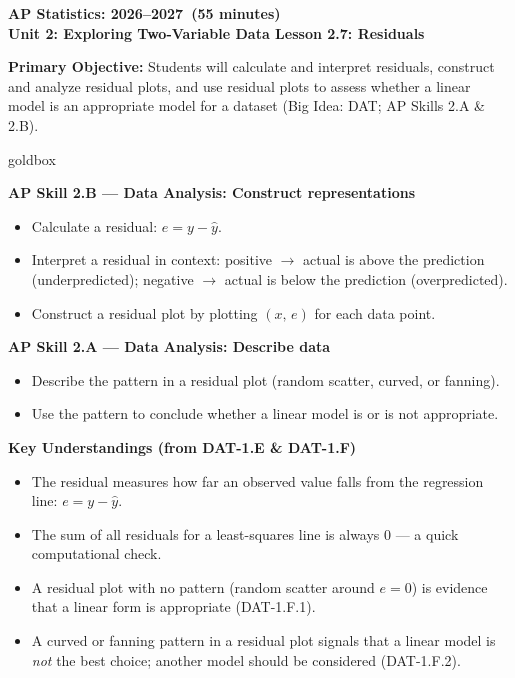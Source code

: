 \documentclass[10pt]{article}
\newcommand{\CourseName}{AP Statistics}
\newcommand{\SchoolYear}{2026--2027}
\newcommand{\MeetingLength}{55 minutes}
\newcommand{\UnitNumberName}{Unit 2: Exploring Two-Variable Data \quad}
\newcommand{\LessonNumberName}{Lesson 2.7: Residuals}
\begin{document}
\begin{center}
    {\Large\bfseries \CourseName: \SchoolYear\ (\MeetingLength) \\
    {\small\bfseries \UnitNumberName \LessonNumberName}}
\end{center}

\begin{tcolorbox}[colback=sky,colframe=navy,boxrule=0.9pt,arc=2mm,
    left=2mm,right=2mm,top=1.5mm,bottom=1.5mm]
    \textbf{Primary Objective:} Students will calculate and interpret residuals, construct and
    analyze residual plots, and use residual plots to assess whether a linear model is an
    appropriate model for a dataset (Big Idea: DAT; AP Skills 2.A \& 2.B).
\end{tcolorbox}

\begin{skillbox}{goldbox}
\begin{minipage}[t]{0.48\linewidth}
    \textbf{AP Skill 2.B --- Data Analysis: Construct representations}
    \begin{itemize}
        \item Calculate a residual: $e = y - \hat{y}$.
        \item Interpret a residual in context: positive $\to$ actual is above the prediction
              (underpredicted); negative $\to$ actual is below the prediction (overpredicted).
        \item Construct a residual plot by plotting $(x,\, e)$ for each data point.
    \end{itemize}
    \textbf{AP Skill 2.A --- Data Analysis: Describe data}
    \begin{itemize}
        \item Describe the pattern in a residual plot (random scatter, curved, or fanning).
        \item Use the pattern to conclude whether a linear model is or is not appropriate.
    \end{itemize}
\end{minipage}
\hfill
\begin{minipage}[t]{0.48\linewidth}
    \textbf{Key Understandings (from DAT-1.E \& DAT-1.F)}
    \begin{itemize}
        \item The residual measures how far an observed value falls from the regression line:
              $e = y - \hat{y}$.
        \item The sum of all residuals for a least-squares line is always 0 --- a quick
              computational check.
        \item A residual plot with no pattern (random scatter around $e = 0$) is evidence
              that a linear form is appropriate (DAT-1.F.1).
        \item A curved or fanning pattern in a residual plot signals that a linear model is
              \textit{not} the best choice; another model should be considered (DAT-1.F.2).
    \end{itemize}
\end{minipage}
\end{skillbox}
\end{document}
